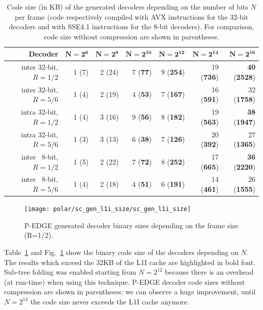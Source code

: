 \begin{table}
  \begin{center}
  \begin{tabular}{r r r r r r r}
    \textbf{Decoder}         & $\bm{N = 2^6}$ & $\bm{N = 2^8}$ & $\bm{N = 2^{10}}$ & $\bm{N = 2^{12}}$ & $\bm{N = 2^{14}}$ & $\bm{N = 2^{16}}$           \\
    \hline
    \hline
    inter 32-bit, $R = 1/2$  & 1 (7)          & 2 (24)         & 7 (\textbf{77})   & 9 (\textbf{254})  & 19 (\textbf{736}) & \textbf{40} (\textbf{2528}) \\
    inter 32-bit, $R = 5/6$  & 1 (4)          & 2 (19)         & 4 (\textbf{53})   & 7 (\textbf{167})  & 16 (\textbf{591}) & 32          (\textbf{1758}) \\
    intra 32-bit, $R = 1/2$  & 1 (4)          & 3 (16)         & 9 (\textbf{56})   & 8 (\textbf{182})  & 19 (\textbf{563}) & \textbf{38} (\textbf{1947}) \\
    intra 32-bit, $R = 5/6$  & 1 (3)          & 3 (13)         & 6 (\textbf{38})   & 7 (\textbf{126})  & 20 (\textbf{392}) & 27          (\textbf{1365}) \\
    inter ~8-bit, $R = 1/2$  & 1 (5)          & 2 (22)         & 7 (\textbf{72})   & 8 (\textbf{252})  & 17 (\textbf{665}) & \textbf{36} (\textbf{2220}) \\
    inter ~8-bit, $R = 5/6$  & 1 (4)          & 2 (18)         & 4 (\textbf{51})   & 6 (\textbf{191})  & 14 (\textbf{461}) & 26          (\textbf{1555}) \\
  \end{tabular}
  \end{center}
  \caption{Code size (in KB) of the generated decoders depending on the number
    of bits $N$ per frame (code respectively compiled with AVX instructions for
    the 32-bit decoders and with SSE4.1 instructions for the 8-bit decoders).
    For comparison, code size without compression are shown in parentheses.}
  \label{tab:eval_polar_sc_gen_l1i_size}
\end{table}

\begin{figure}
  \texttt{[image: polar/sc\_gen\_l1i\_size/sc\_gen\_l1i\_size]}
  \caption{P-EDGE generated decoder binary sizes depending on the frame size
    (R=1/2).}
  \label{plot:eval_polar_sc_gen_l1i_size}
\end{figure}

Table~\ref{tab:eval_polar_sc_gen_l1i_size} and
Fig.~\ref{plot:eval_polar_sc_gen_l1i_size} show the binary code size of the
decoders depending on $N$. The results which exceed the 32KB of the L1I cache
are highlighted in bold font. Sub-tree folding was enabled starting from
$N=2^{12}$ because there is an overhead (at run-time) when using this technique.
P-EDGE decoder code sizes without compression are shown in parentheses: we can
observe a huge improvement, until $N=2^{14}$ the code size never exceeds the L1I
cache anymore.

